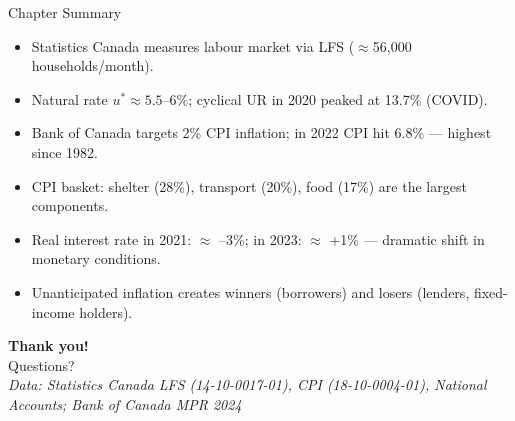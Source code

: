 \documentclass[aspectratio=169]{beamer}
\begin{document}
\begin{frame}{Chapter Summary}
\transfade
\begin{itemize}
  \item Statistics Canada measures labour market via LFS ($\approx$56,000 households/month).
  \item Natural rate $u^* \approx 5.5$--$6\%$; cyclical UR in 2020 peaked at 13.7\% (COVID).
  \item Bank of Canada targets 2\% CPI inflation; in 2022 CPI hit 6.8\% --- highest since 1982.
  \item CPI basket: shelter (28\%), transport (20\%), food (17\%) are the largest components.
  \item Real interest rate in 2021: $\approx$ --3\%; in 2023: $\approx$ +1\% --- dramatic shift in monetary conditions.
  \item Unanticipated inflation creates winners (borrowers) and losers (lenders, fixed-income holders).
\end{itemize}
\end{frame}

\begin{frame}
\centering
\Huge \textbf{Thank you!}\\[1em]
\normalsize Questions?\\[0.5em]
\small\itshape Data: Statistics Canada LFS (14-10-0017-01), CPI (18-10-0004-01), National Accounts; Bank of Canada MPR 2024
\end{frame}
\end{document}
